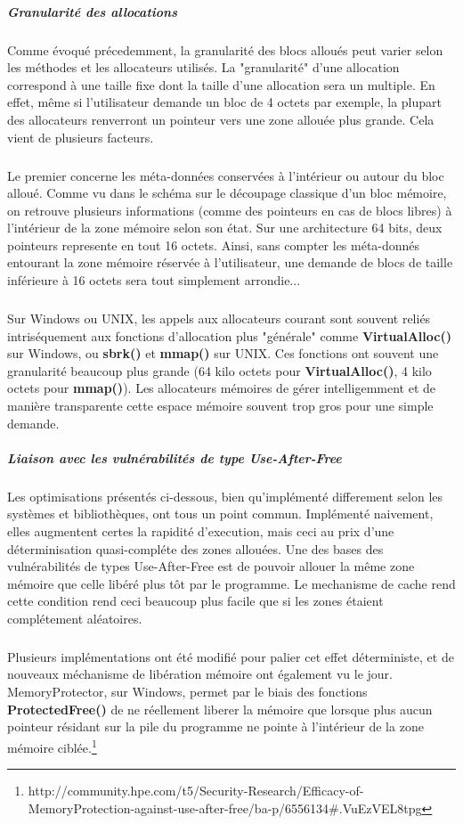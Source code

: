 \subparagraph{Granularité des allocations}
Comme évoqué précedemment, la granularité des blocs alloués peut varier selon les méthodes et les allocateurs utilisés. La "granularité" d'une allocation
correspond à une taille fixe dont la taille d'une allocation sera un multiple. En effet, même si l'utilisateur demande un bloc de 4 octets par exemple, la plupart
des allocateurs renverront un pointeur vers une zone allouée plus grande. Cela vient de plusieurs facteurs.

\subparagraph{}
Le premier concerne les méta-données conservées à l'intérieur ou autour du bloc alloué. Comme vu dans le schéma sur le découpage classique d'un bloc mémoire,
on retrouve plusieurs informations (comme des pointeurs en cas de blocs libres) à l'intérieur de la zone mémoire selon son état. Sur une architecture 64 bits,
deux pointeurs represente en tout 16 octets. Ainsi, sans compter les méta-donnés entourant la zone mémoire réservée à l'utilisateur, une demande de blocs de taille
inférieure à 16 octets sera tout simplement arrondie...
\subparagraph{}
Sur Windows ou UNIX, les appels aux allocateurs courant sont souvent reliés intriséquement aux fonctions d'allocation plus "générale" comme  \textbf{VirtualAlloc()} sur
Windows, ou \textbf{sbrk()} et \textbf{mmap()} sur UNIX. Ces fonctions ont souvent une granularité beaucoup plus grande (64 kilo octets pour \textbf{VirtualAlloc()}, 4 kilo octets
pour \textbf{mmap()}). Les allocateurs mémoires de gérer intelligemment et de manière transparente cette espace mémoire souvent trop gros pour une simple demande.

\subparagraph{Liaison avec les vulnérabilités de type Use-After-Free}
Les optimisations présentés ci-dessous, bien qu'implémenté differement selon les systèmes et bibliothèques, ont tous un point commun.
Implémenté naivement, elles augmentent certes la rapidité d'execution, mais ceci au prix d'une déterminisation quasi-compléte des zones allouées.
Une des bases des vulnérabilités de types Use-After-Free est de pouvoir allouer la même zone mémoire que celle libéré plus tôt par le programme.
Le mechanisme de cache rend cette condition rend ceci beaucoup plus facile que si les zones étaient complétement aléatoires.

\subparagraph{}
Plusieurs implémentations ont été modifié pour palier cet effet déterministe, et de nouveaux méchanisme de libération mémoire ont également vu le jour.
MemoryProtector, sur Windows, permet par le biais des fonctions \textbf{ProtectedFree()} de ne réellement liberer la mémoire que lorsque plus aucun pointeur
résidant sur la pile du programme ne pointe à l'intérieur de la zone mémoire ciblée.\footnote{http://community.hpe.com/t5/Security-Research/Efficacy-of-MemoryProtection-against-use-after-free/ba-p/6556134\#.VuEzVEL8tpg}

